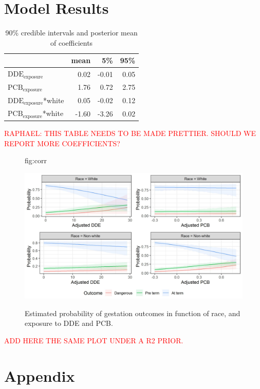 \documentclass[wcp]{jmlr}%
\begin{document}
\section*{Model Results}
\begin{table}
	\centering
	\begin{tabular}{l|r|r|r}
		\hline
		& mean & 5\% & 95\%\\
		\hline
		$\text{DDE}_{\text{exposure}}$ & 0.02 & -0.01 & 0.05\\
		\hline
		$\text{PCB}_{\text{exposure}}$& 1.76 & 0.72 & 2.75\\
		\hline
		$\text{DDE}_{\text{exposure}}$*white & 0.05 & -0.02 & 0.12\\
		\hline
		$\text{PCB}_{\text{exposure}}$*white & -1.60 & -3.26 & 0.02\\
		\hline
	\end{tabular}
    \caption{\label{tab:confints} 90\% credible intervals and posterior mean of coefficients}
\end{table}
\textcolor{red}{RAPHAEL: THIS TABLE NEEDS TO BE MADE PRETTIER. SHOULD WE REPORT MORE COEFFICIENTS?}

\begin{figure}[htbp]
	\floatconts
	{fig:corr}
	{\caption{Estimated probability of gestation outcomes in function of race, and exposure to DDE and PCB.}}
	{\includegraphics[width=0.8\linewidth]{results}}
\end{figure}

\textcolor{red}{ADD HERE THE SAME PLOT UNDER A R2 PRIOR.}

\newpage
\appendix
\section{Appendix}
\end{document}
